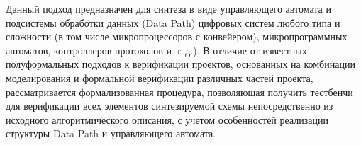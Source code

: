 \begin{center}\small\nwt
\parbox{150mm}{ Данный подход  предназначен для синтеза в виде управляющего автомата и подсистемы обработки данных (Data Path) цифровых систем любого типа и сложности (в том числе микропроцессоров с конвейером), 
микропрограммных автоматов, контроллеров протоколов и~т.\,д.).
В отличие от известных полуформальных подходов к верификации проектов, основанных на комбинации моделирования и формальной верификации различных частей проекта, рассматривается формализованная процедура, позволяющая получить тестбенчи для 
верификации всех элементов синтезируемой схемы непосредственно из исходного алгоритмического описания, с учетом особенностей реализации структуры  Data Path и управляющего автомата.}
\end{center}


\label{end\stat}

\renewcommand{\figurename}{\protect\bf Рис.}
\renewcommand{\tablename}{\protect\bf Таблица}
\renewcommand{\bibname}{\protect\rmfamily Литература}
